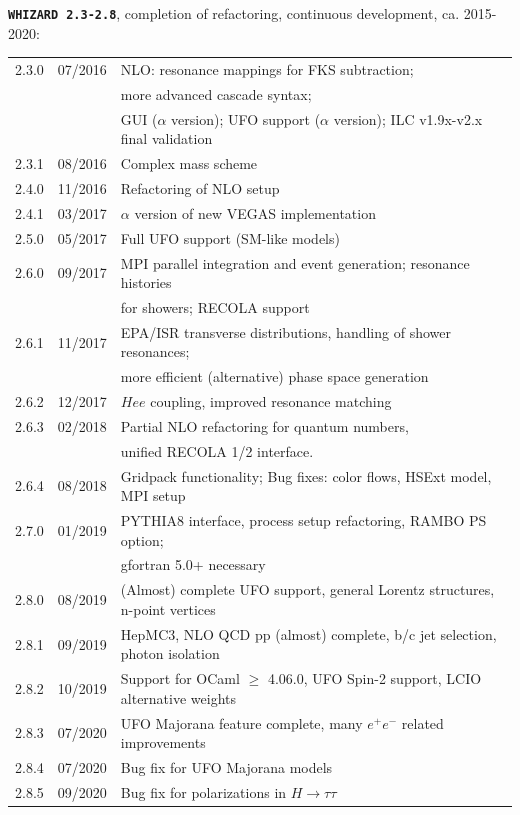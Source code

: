 \documentclass[12pt]{book}
\newcommand{\ttt}[1]{\texttt{#1}}
\newcommand{\whizard}{\ttt{WHIZARD}}
\begin{document}
{
{\bf \whizard\ \texttt{2.3-2.8}}, completion of refactoring, continuous
development, ca. 2015-2020:
\nopagebreak[4]
\begin{center}
\begin{tabular}{|l|l|l|}\hline
  2.3.0 & 07/2016 & NLO: resonance mappings for FKS subtraction; \\
  & & more advanced cascade syntax; \\
  & & GUI ($\alpha$ version); UFO support
  ($\alpha$ version); ILC v1.9x-v2.x final validation \\
  2.3.1 & 08/2016 & Complex mass scheme
  \\\hline
  2.4.0 & 11/2016 & Refactoring of NLO setup \\
  2.4.1 & 03/2017 & $\alpha$ version of new VEGAS implementation
  \\\hline
  2.5.0 & 05/2017 & Full UFO support (SM-like models)
  \\\hline
  2.6.0 & 09/2017 & MPI parallel integration and event generation;
  resonance histories \\
  & & for showers; RECOLA support \\
  2.6.1 & 11/2017 & EPA/ISR transverse distributions, handling of
  shower resonances; \\
  & & more efficient (alternative) phase space generation \\
  2.6.2 & 12/2017 & $Hee$ coupling, improved resonance matching \\
  2.6.3 & 02/2018 & Partial NLO refactoring for quantum numbers, \\
  &  & unified RECOLA 1/2 interface. \\
  2.6.4 & 08/2018 & Gridpack functionality; Bug fixes: color flows,
  HSExt model, MPI setup
  \\\hline
  2.7.0 & 01/2019 & PYTHIA8 interface, process setup refactoring,
  RAMBO PS option; \\
  & & \quad gfortran 5.0+ necessary
  \\\hline
  2.8.0 & 08/2019 & (Almost) complete UFO support, general Lorentz
  structures, n-point vertices \\
  2.8.1 & 09/2019 & HepMC3, NLO QCD pp (almost)
  complete, b/c jet selection, photon isolation \\
  2.8.2 & 10/2019 & Support for OCaml $\geq$ 4.06.0, UFO Spin-2 support,
  LCIO alternative weights \\
  2.8.3 & 07/2020 & UFO Majorana feature complete, many $e^+e^-$ related
  improvements \\
  2.8.4 & 07/2020 & Bug fix for UFO Majorana models \\
  2.8.5 & 09/2020 & Bug fix for polarizations in $H\to\tau\tau$
  \\\hline\hline
\end{tabular}
\end{center}
}
\end{document}
